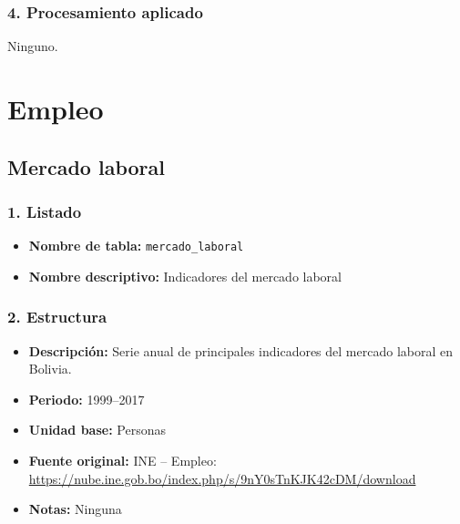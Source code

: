 \documentclass[12pt,a4paper]{article}
\begin{document}
\subsubsection*{4. Procesamiento aplicado}
Ninguno.





\section{Empleo}
\subsection{Mercado laboral}

\subsubsection*{1. Listado}
\begin{itemize}
  \item \textbf{Nombre de tabla:} \texttt{mercado\_laboral}
  \item \textbf{Nombre descriptivo:} Indicadores del mercado laboral
\end{itemize}

\subsubsection*{2. Estructura}
\begin{itemize}
  \item \textbf{Descripción:} Serie anual de principales indicadores del mercado laboral en Bolivia.
  \item \textbf{Periodo:} 1999–2017
  \item \textbf{Unidad base:} Personas
  \item \textbf{Fuente original:}  
    INE – Empleo:\\  
    \url{https://nube.ine.gob.bo/index.php/s/9nY0sTnKJK42cDM/download}
  \item \textbf{Notas:} Ninguna
\end{itemize}
\end{document}
